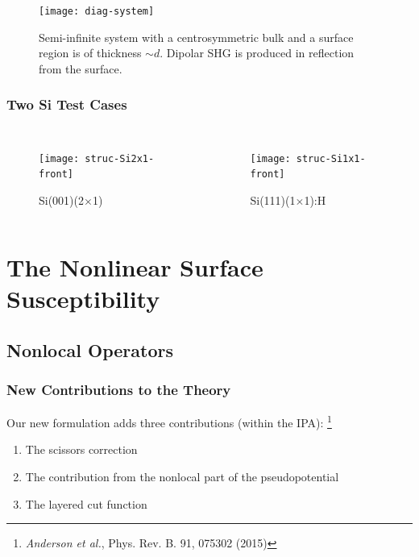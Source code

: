 \documentclass{beamer}
\begin{document}
\begin{frame}
\begin{figure}
\centering
\texttt{[image: diag-system]}
\caption{Semi-infinite system with a centrosymmetric bulk and a surface region
is of thickness $\sim d$. Dipolar SHG is produced in reflection from the
surface.}
\end{figure}
\end{frame}

\begin{frame}
\frametitle{Two Si Test Cases}
\begin{columns}
\begin{figure}
\centering
\texttt{[image: struc-Si2x1-front]}
\vspace{-0.4cm}
\caption{Si(001)(2$\times$1)}
\end{figure}
\begin{figure}
\centering
\texttt{[image: struc-Si1x1-front]}
\vspace{-0.4cm}
\caption{Si(111)(1$\times$1):H}
\end{figure}
\end{columns}
\end{frame}



\section{The Nonlinear Surface Susceptibility}



\subsection{Nonlocal Operators}

\begin{frame}
\frametitle{New Contributions to the Theory}
Our new formulation adds three contributions (within the IPA):%
\footnote{\emph{Anderson et al.}, Phys. Rev. B. 91, 075302 (2015)}
\begin{enumerate}
\item The scissors correction
\item The contribution from the nonlocal part of the pseudopotential
\item The layered cut function
\end{enumerate}
\end{frame}
\end{document}

